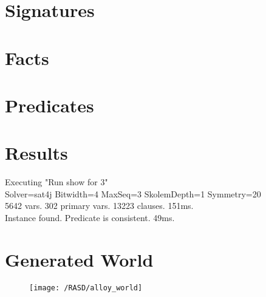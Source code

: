 
\section{Signatures}
	

\newpage
\section{Facts}
	

\newpage
\section{Predicates}
	

\section{Results}
Executing "Run show for 3" \\
Solver=sat4j Bitwidth=4 MaxSeq=3 SkolemDepth=1 Symmetry=20 \\
5642 vars. 302 primary vars. 13223 clauses. 151ms. \\
Instance found. Predicate is consistent. 49ms. \\

\newpage
\section{Generated World}
\begin{figure}[!ht]
  \centering
  \vspace{0.2cm}
  \texttt{[image: /RASD/alloy\_world]}\\
  \vspace{0.2cm}
  \label{fig:alloy_world} 
\end{figure}
